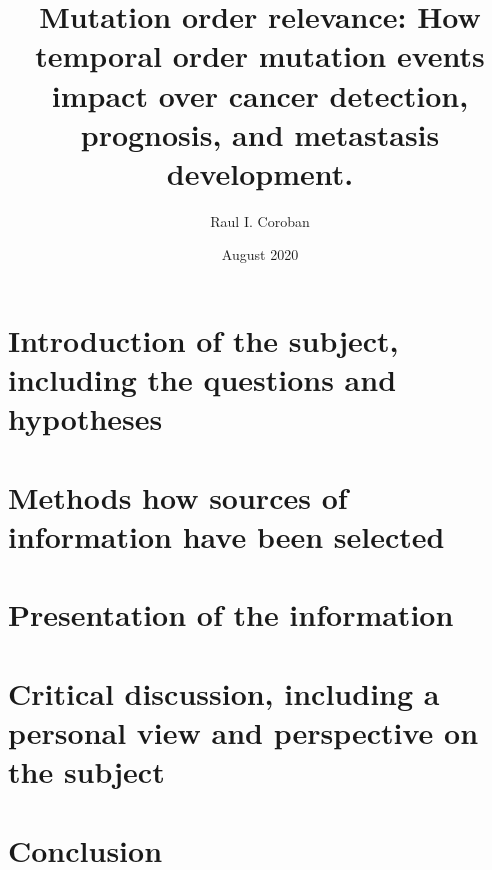 \documentclass[a4paper]{article}
\title{Mutation order relevance: How temporal order mutation events impact over cancer detection, prognosis, and metastasis development.}
\author{Raul I. Coroban}
\date{August 2020}
\begin{document}
\maketitle

\begin{abstract}

\end{abstract}

\section{Introduction of the subject, including the questions and hypotheses}


\section{Methods how sources of information have been selected}


\section{Presentation of the information}


\section{Critical discussion, including a personal view and perspective on the subject}


\section{Conclusion}




\end{document}
